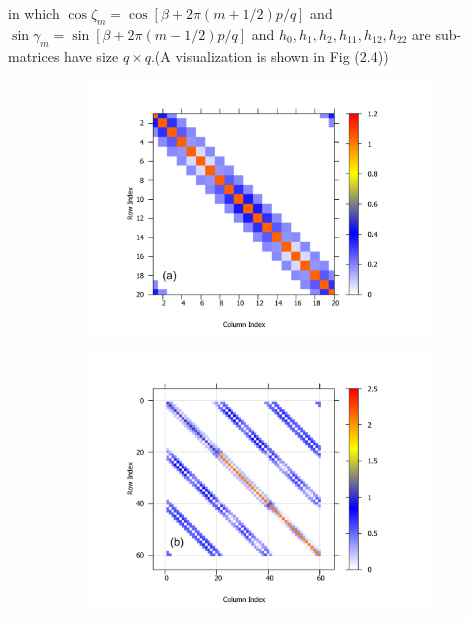 \documentclass{report}
\begin{document}
in which $\cos \zeta_{m} = \cos \left[\beta + 2 \pi (m + 1/2)p / q\right]$ and $\sin \gamma_{m} = \sin \left[\beta + 2 \pi (m - 1/2)p / q\right]$ and $h_{0},h_{1},h_{2},h_{11},h_{12},h_{22}$ are sub-matrices have size $q \times q$.(A visualization is shown in Fig (2.4))
\begin{figure}[htb]
	\centering
	\begin{subfigure}[b]{0.496\textwidth}
		\centering
		\includegraphics[width=1.1\textwidth,height=1.0\textwidth]{pic/matrix_1band_h0.pdf}
		\label{fig:3 band matrix}
	\end{subfigure}
	\begin{subfigure}[b]{0.496\textwidth}
		\centering
		\includegraphics[width=1.1\textwidth,height=1.0\textwidth]{pic/matrix_3band.pdf}

\end{subfigure}
\end{figure}
\end{document}
